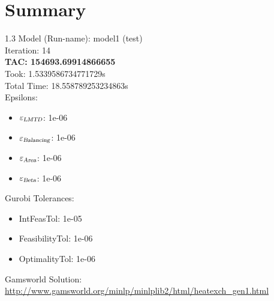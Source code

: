 \documentclass{article}%
\begin{document}
%
\normalsize%
\section{Summary}%
\thispagestyle{plain}%
\begin{spacing}{1.3}%
\Large%
Model (Run-name): model1 (test)\\%
Iteration: 14\\%
\textbf{TAC: 154693.69914866655}\\%
Took: 1.5339586734771729s\\%
Total Time: 18.558789253234863s\\%
Epsilons:%
\begin{itemize}%
	\item $\varepsilon_{\textsl{LMTD}}$: 1e-06%
	\item $\varepsilon_{\textsl{Balancing}}$: 1e-06%
	\item $\varepsilon_{\textsl{Area}}$: 1e-06%
	\item $\varepsilon_{\textsl{Beta}}$: 1e-06%
\end{itemize}%
Gurobi Tolerances:%
\begin{itemize}%
	\item IntFeasTol: 1e-05%
	\item FeasibilityTol: 1e-06%
	\item OptimalityTol: 1e-06%
\end{itemize}%
\end{spacing}%
\normalsize%
Gamsworld Solution: \url{http://www.gamsworld.org/minlp/minlplib2/html/heatexch_gen1.html}%
%
\clearpage%
\end{document}
